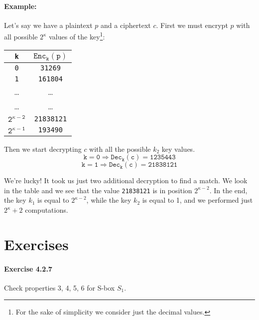 \documentclass{article}
\begin{document}
  \paragraph{Example:}

  Let's say we have a plaintext $p$ and a ciphertext
  $c$.
  First we must encrypt $p$ with all possible $2^{\kappa}$ values of
  the key\footnote{For the sake of simplicity we consider just the
  decimal values.}:
  \begin{center}
	\begin{tabular}{|c|c|}
	  \hline
	  \texttt{k} & $\mathtt{Enc_{k}(p)}$ \\
	  \hline
	  \texttt{0} & \texttt{31269} \\
	  \hline
	  \texttt{1} & \texttt{161804} \\
	  \hline  
	  \dots & \dots \\
	  \hline
	  \dots & \dots \\
	  \hline
	  \texttt{$\mathtt{2^{\kappa-2}}$} & \texttt{21838121} \\
	  \hline
	  \texttt{$\mathtt{2^{\kappa-1}}$} & \texttt{193490} \\
	  \hline
	\end{tabular}
  \end{center}
  
  Then we start decrypting $c$ with all the possible $k_{2}$ key values.
  $$
	\mathtt{k=0} \Rightarrow \mathtt{Dec_{k}(c) = 1235443} 
  $$
  $$
	\mathtt{k=1} \Rightarrow \mathtt{Dec_{k}(c) = 21838121}
  $$

  We're lucky! It took us just two additional decryption to find a
  match. We look in the table and we see that the value
  \texttt{21838121} is in position $2^{\kappa-2}$. 
  In the end, the key $k_{1}$ is equal to $2^{\kappa-2}$, while the key $k_{2}$ is
  equal to 1, and we performed just $2^{\kappa} + 2$ computations.


  \section{Exercises}

  \hypertarget{ex427}{\paragraph{Exercise 4.2.7}}

  Check properties 3, 4, 5, 6 for S-box $S_{1}$.
\end{document}
